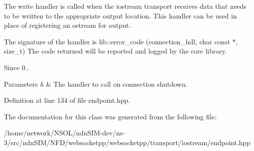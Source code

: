 The write handler is called when the iostream transport receives data that needs to be written to the appropriate output location. This handler can be used in place of registering an ostream for output.

The signature of the handler is {\ttfamily lib\+::error\+\_\+code (connection\+\_\+hdl, char const $\ast$, size\+\_\+t)} The code returned will be reported and logged by the core library.

\begin{DoxySince}{Since}
0..
\end{DoxySince}

\begin{DoxyParams}{Parameters}
{\em h} & The handler to call on connection shutdown. \\
\hline
\end{DoxyParams}


Definition at line 134 of file endpoint.\+hpp.



The documentation for this class was generated from the following file\+:\begin{DoxyCompactItemize}
\item 
/home/network/\+N\+S\+O\+L/ndn\+S\+I\+M-\/dev/ns-\/3/src/ndn\+S\+I\+M/\+N\+F\+D/websocketpp/websocketpp/transport/iostream/endpoint.\+hpp\end{DoxyCompactItemize}
